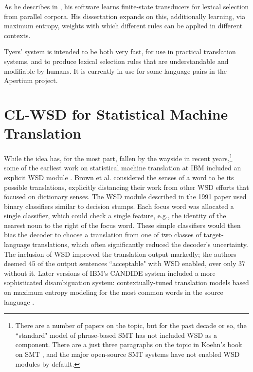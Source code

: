 As he describes in \cite{tyers-fst}, his software learns finite-state
transducers for lexical selection from parallel corpora.
His dissertation expands on this, additionally learning, via maximum entropy,
weights with which different rules can be applied in different contexts.

Tyers' system is intended to be both very fast, for use in practical
translation systems, and to produce lexical selection rules that are
understandable and modifiable by humans. It is currently in use for some
language pairs in the Apertium project.

\section{CL-WSD for Statistical Machine Translation}
While the idea has, for the most part, fallen by the wayside in recent
years,\footnote{There are a number of papers on the topic, but for the past
decade or so, the ``standard" model of phrase-based SMT has not included WSD as
a component. There are a just three paragraphs on the topic in Koehn's book on
SMT \cite[\S 5.3.6]{koehn2010statistical}, and the major open-source SMT
systems have not enabled WSD modules by default.}
some of the earliest work on statistical machine translation at IBM included
an explicit WSD module \cite{Brown91word-sensedisambiguation}.
Brown et al. considered the senses of a word to be its possible translations,
explicitly distancing their work from other WSD efforts that focused on
dictionary senses.
The WSD module described in the 1991 paper used binary classifiers similar to
decision stumps. Each focus word was allocated a single classifier, which could
check a single feature, e.g., the identity of the nearest noun to the right of
the focus word.
These simple classifiers would then bias the decoder to choose a
translation from one of two classes of target-language translations,
which often significantly reduced the decoder's uncertainty. The inclusion of
WSD improved the translation output markedly; the authors deemed 45 of the
output sentences ``acceptable" with WSD enabled, over only 37 without it.
Later versions of IBM's CANDIDE system included a more sophisticated
disambiguation system: contextually-tuned translation models based on
maximum entropy modeling for the most common words in the source language
\cite{Berger:1994:CSM:1075812.1075844}.

